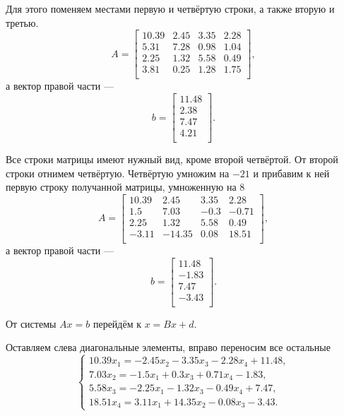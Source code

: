 Для этого поменяем местами первую и четвёртую строки, а также вторую и третью.
\begin{equation*}
A =
\begin{bmatrix}
    10.39 & 2.45 & 3.35 & 2.28 \\
    5.31 & 7.28 & 0.98 & 1.04 \\
    2.25 & 1.32 & 5.58 & 0.49 \\
    3.81 & 0.25 & 1.28 & 1.75 \\
\end{bmatrix},
\end{equation*}
а вектор правой части ---
\begin{equation*}
b =
\begin{bmatrix}
    11.48 \\
    2.38 \\
    7.47 \\
    4.21 \\
\end{bmatrix}.
\end{equation*}

Все строки матрицы имеют нужный вид, кроме второй четвёртой.
От второй строки отнимем четвёртую.
Четвёртую умножим на $-21$ и прибавим к ней первую строку получанной матрицы, умноженную на 8
\begin{equation*}
A =
\begin{bmatrix}
    10.39 & 2.45 & 3.35 & 2.28 \\
    1.5 & 7.03 & -0.3 & -0.71 \\
    2.25 & 1.32 & 5.58 & 0.49 \\
    -3.11 & -14.35 & 0.08 & 18.51 \\
\end{bmatrix},
\end{equation*}
а вектор правой части ---
\begin{equation*}
b =
\begin{bmatrix}
    11.48 \\
    -1.83 \\
    7.47 \\
    -3.43 \\
\end{bmatrix}.
\end{equation*}

От системы $Ax = b$ перейдём к $x = Bx + d$.

Оставляем слева диагональные элементы, вправо переносим все остальные
$$ \begin{cases}
    10.39 x_1 = -2.45 x_2 - 3.35 x_3 - 2.28 x_4 + 11.48, \\
    7.03 x_2 = -1.5 x_1 + 0.3 x_3 + 0.71 x_4 - 1.83, \\
    5.58 x_3 = -2.25 x_1 - 1.32 x_3 - 0.49 x_4 + 7.47, \\
    18.51 x_4 = 3.11 x_1 + 14.35 x_2 - 0.08 x_3 - 3.43.
  \end{cases}$$

